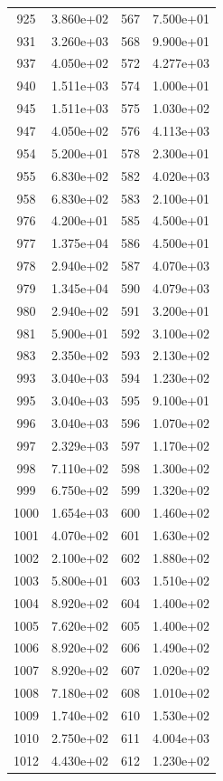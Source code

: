 \documentclass[12pt]{article}
\begin{document}
\begin{longtable}{@{}cccc@{}}
925 & 3.860e+02 & 567 & 7.500e+01 \\
931 & 3.260e+03 & 568 & 9.900e+01 \\
937 & 4.050e+02 & 572 & 4.277e+03 \\
940 & 1.511e+03 & 574 & 1.000e+01 \\
945 & 1.511e+03 & 575 & 1.030e+02 \\
947 & 4.050e+02 & 576 & 4.113e+03 \\
954 & 5.200e+01 & 578 & 2.300e+01 \\
955 & 6.830e+02 & 582 & 4.020e+03 \\
958 & 6.830e+02 & 583 & 2.100e+01 \\
976 & 4.200e+01 & 585 & 4.500e+01 \\
977 & 1.375e+04 & 586 & 4.500e+01 \\
978 & 2.940e+02 & 587 & 4.070e+03 \\
979 & 1.345e+04 & 590 & 4.079e+03 \\
980 & 2.940e+02 & 591 & 3.200e+01 \\
981 & 5.900e+01 & 592 & 3.100e+02 \\
983 & 2.350e+02 & 593 & 2.130e+02 \\
993 & 3.040e+03 & 594 & 1.230e+02 \\
995 & 3.040e+03 & 595 & 9.100e+01 \\
996 & 3.040e+03 & 596 & 1.070e+02 \\
997 & 2.329e+03 & 597 & 1.170e+02 \\
998 & 7.110e+02 & 598 & 1.300e+02 \\
999 & 6.750e+02 & 599 & 1.320e+02 \\
1000 & 1.654e+03 & 600 & 1.460e+02 \\
1001 & 4.070e+02 & 601 & 1.630e+02 \\
1002 & 2.100e+02 & 602 & 1.880e+02 \\
1003 & 5.800e+01 & 603 & 1.510e+02 \\
1004 & 8.920e+02 & 604 & 1.400e+02 \\
1005 & 7.620e+02 & 605 & 1.400e+02 \\
1006 & 8.920e+02 & 606 & 1.490e+02 \\
1007 & 8.920e+02 & 607 & 1.020e+02 \\
1008 & 7.180e+02 & 608 & 1.010e+02 \\
1009 & 1.740e+02 & 610 & 1.530e+02 \\
1010 & 2.750e+02 & 611 & 4.004e+03 \\
1012 & 4.430e+02 & 612 & 1.230e+02 \\

\end{longtable}
\end{document}
